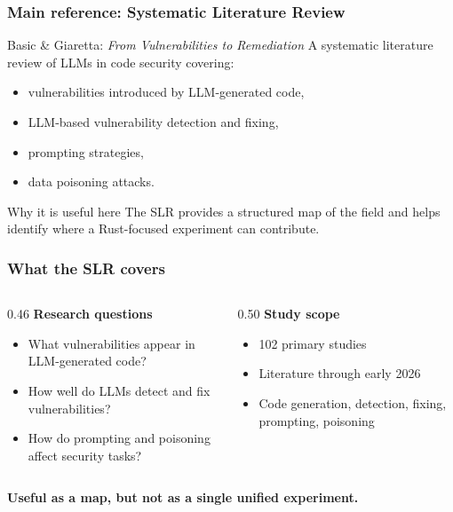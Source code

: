 \begin{frame}
\frametitle{Main reference: Systematic Literature Review}

\begin{block}{Basic \& Giaretta: \textit{From Vulnerabilities to Remediation}}
A systematic literature review of LLMs in code security covering:
\begin{itemize}
    \item vulnerabilities introduced by LLM-generated code,
    \item LLM-based vulnerability detection and fixing,
    \item prompting strategies,
    \item data poisoning attacks.
\end{itemize}
\end{block}

\medskip

\begin{exampleblock}{Why it is useful here}
The SLR provides a structured map of the field and helps identify where a Rust-focused experiment can contribute.
\end{exampleblock}

\end{frame}


\begin{frame}
\frametitle{What the SLR covers}

\begin{columns}[T]
\begin{column}{0.46\textwidth}
\textbf{Research questions}
\begin{itemize}
    \item What vulnerabilities appear in LLM-generated code?
    \item How well do LLMs detect and fix vulnerabilities?
    \item How do prompting and poisoning affect security tasks?
\end{itemize}
\end{column}

\begin{column}{0.50\textwidth}
\textbf{Study scope}
\begin{itemize}
    \item 102 primary studies
    \item Literature through early 2026
    \item Code generation, detection, fixing, prompting, poisoning
\end{itemize}
\end{column}
\end{columns}

\bigskip

\centering
\textbf{Useful as a map, but not as a single unified experiment.}

\end{frame}

